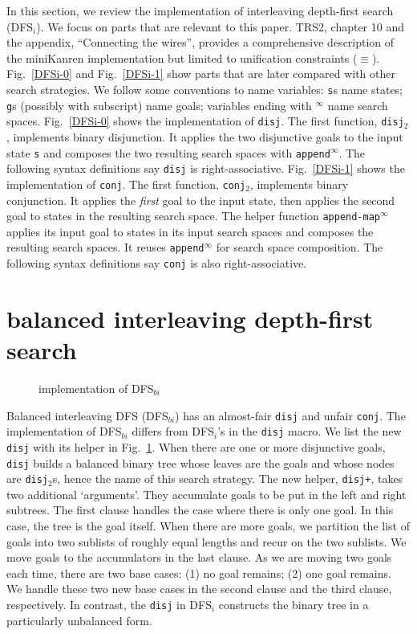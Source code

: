 \documentclass[format=acmlarge, review=true, authordraft=true]{acmart}
\newcommand{\conj}{\texttt{conj}}
\newcommand{\disj}{\texttt{disj}}
\newcommand{\disjtwo}{\texttt{disj$_2$}}
\newcommand{\conjtwo}{\texttt{conj$_2$}}
\newcommand{\DFSi }[0]{DFS$_{i}$}
\newcommand{\DFSbi}[0]{DFS$_{bi}$}
\begin{document}
In this section, we review the implementation of interleaving depth-first 
search (\DFSi). We focus on parts that are relevant to this paper. TRS2,
chapter 10 and the appendix, ``Connecting the wires'', 
provides a comprehensive description of the 
miniKanren 
implementation but limited to unification constraints ($\equiv$).
Fig.~\ref{DFSi-0} and Fig.~\ref{DFSi-1} show parts that are later compared 
with other search 
strategies. We follow some conventions to name variables: \texttt{s}s name 
states; \texttt{g}s (possibly with subscript) name goals; 
variables ending with $^\infty$ name search spaces. Fig.~\ref{DFSi-0} shows the 
implementation of \disj. The 
first function, \disjtwo, implements binary disjunction. It applies the 
two disjunctive goals to the input state \texttt{s} and composes the two 
resulting search spaces with \texttt{append$^\infty$}. The following syntax 
definitions say \disj{} is right-associative. Fig.~\ref{DFSi-1} 
shows the implementation of \conj. The first function, \conjtwo{}, 
implements binary conjunction. 
It applies the \emph{first} goal to the input state, then applies the second 
goal to states in the resulting search space. The helper function 
\texttt{append-map$^\infty$} applies its input goal to states 
in its input search spaces and composes the resulting search spaces. It reuses 
\texttt{append$^\infty$} for search space composition. The following syntax 
definitions say \conj{} is also right-associative.

\section{balanced interleaving depth-first search}

\begin{figure}
	
	\caption{implementation of \DFSbi{}}
	\label{balanced-disj}
\end{figure}

Balanced interleaving DFS (\DFSbi{}) has an almost-fair \disj{} and unfair 
\conj{}. The implementation of \DFSbi{} differs from 
\DFSi{}'s in the \disj{} macro. We list the new \disj{} with its 
helper in Fig.~\ref{balanced-disj}. When there are one or more disjunctive 
goals, \disj{} builds a balanced binary tree whose leaves are the goals and 
whose nodes are \disjtwo{}s, hence the name of this search strategy. 
The new helper, \texttt{disj+}, takes two additional `arguments'. They 
accumulate goals to be put in the left and right subtrees. The first clause 
handles the case where there is only one goal. In this case, the tree is the 
goal itself. When there are more goals, we partition the list of goals 
into two sublists of roughly equal lengths and recur on the two sublists. We 
move goals to the accumulators in the last clause. As we are moving 
two goals each time, there are two base cases: (1) no goal remains; (2) one 
goal remains. We handle these two new base cases in the second clause and the 
third clause, respectively. In contrast, the \disj{} in \DFSi{} constructs the 
binary tree in a particularly unbalanced form.
\end{document}
